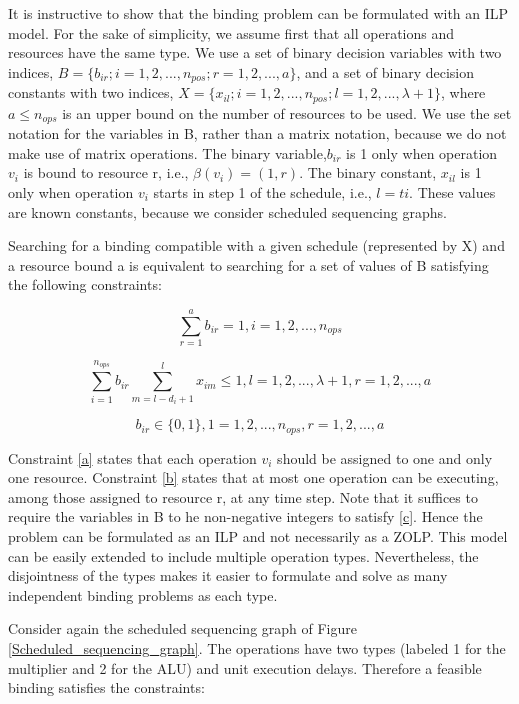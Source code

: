 It is instructive to show that the binding problem can be formulated with an ILP model. For the sake of simplicity, we assume first that all operations and resources have the same type. We use a set of binary decision variables with two indices, $ B=\{b_{ir};i=1,2,...,n_{pos};r=1,2,...,a\} $, and a set of binary decision constants with two indices, $ X=\{x_{il};i=1,2,...,n_{pos};l=1,2,...,\lambda+1\} $, where $ a\leq n_{ops} $ is an upper bound on the number of resources to be used. We use the set notation for the variables in B, rather than a matrix notation, because we do not make use of matrix operations. The binary variable,$ b_{ir} $ is 1 only when operation $ v_{i} $ is bound to resource r, i.e., $ \beta(v_{i})=(1,r) $. The binary constant, $ x_{il} $ is 1 only when operation $ v_{i} $  starts in step 1 of the schedule, i.e., $ l = t{i} $. These values are known constants, because we consider scheduled sequencing graphs. 

Searching for a binding compatible with a given schedule (represented by X) and a resource bound a is equivalent to searching for a set of values of B satisfying 
the following constraints: 

\begin{equation}\label{a}
 \sum_{r=1}^{a} b_{ir} = 1, i=1,2,...,n_{ops} 
\end{equation}

\begin{equation}\label{b}
\sum_{i=1}^{n_{ops}} b_{ir}\sum_{m=l-d_{i}+1}^{l} x_{im} \leq 1, l=1,2,...,\lambda + 1, r=1,2,...,a 
\end{equation}

\begin{equation}\label{c}
b_{ir} \in \{0,1\}, 1 =1,2,...,n_{ops}, r=1,2,...,a
\end{equation}

Constraint \ref{a} states that each operation $ v_{i} $  should be assigned to one and only one resource. Constraint \ref{b} states that at most one operation can be executing, among 
those assigned to resource r, at any time step. Note that it suffices to require the variables in B to he non-negative integers to satisfy \ref{c}. Hence the problem can be formulated as an ILP and not necessarily as a ZOLP. 
This model can be easily extended to include multiple operation types. Nevertheless, the disjointness of the types makes it easier to formulate and solve as many independent binding problems as each type. 

Consider again the scheduled sequencing graph of Figure \ref{Scheduled_sequencing_graph}. The operations have two types (labeled 1 for the multiplier and 2 for the ALU) and unit execution delays. Therefore a feasible binding satisfies the constraints: 

